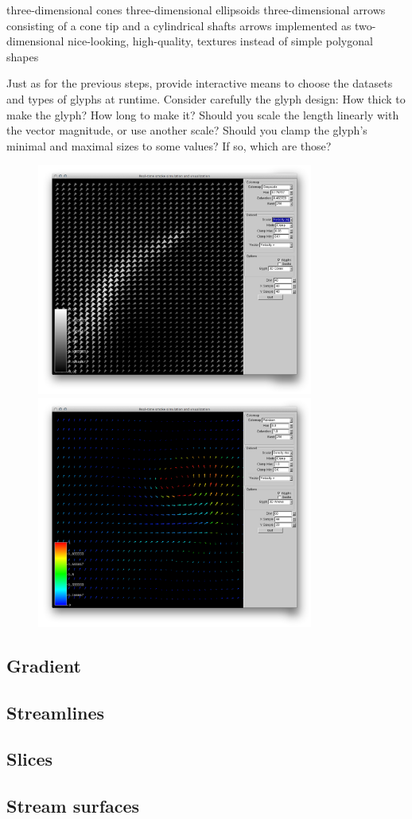 three-dimensional cones
three-dimensional ellipsoids
three-dimensional arrows consisting of a cone tip and a cylindrical shafts
arrows implemented as two-dimensional nice-looking, high-quality, textures instead of simple polygonal shapes
 
Just as for the previous steps, provide interactive means to choose the datasets and types of glyphs at runtime. Consider carefully the glyph design: How thick to make the glyph? How long to make it? Should you scale the length linearly with the vector magnitude, or use another scale? Should you clamp the glyph’s minimal and maximal sizes to some values? If so, which are those?

\begin{figure}[htbp]
\centering
\begin{minipage}[t]{0.48\textwidth}
 \includegraphics[height=3in]{figures/glyph/conesVelocityGrayscale.png}
\caption{}
\label{fig:forceScaled}
\end{minipage}\hspace{.04\textwidth}%
\begin{minipage}[t]{0.48\textwidth}
\includegraphics[height=3in]{figures/glyph/arrowsDensityVelocityRainbow.png}
    \caption{}
    \label{}
\end{minipage}
\end{figure}


\subsection{Gradient}
\subsection{Streamlines}
\subsection{Slices}
\subsection{Stream surfaces}